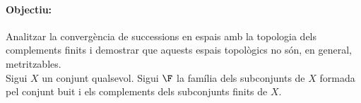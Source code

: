 \newpage
\paragraph{Objectiu:}
Analitzar la convergència de successions en espais amb la topologia dels complements finits i demostrar que aquests espais topològics no són, en general, metritzables.\\

Sigui $X$ un conjunt qualsevol. Sigui $\F$ la família dels subconjunts de $X$ formada pel conjunt buit i els complements dels subconjunts finits de $X$.
